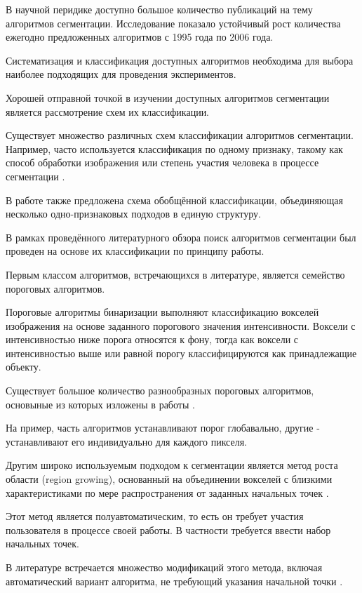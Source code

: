 В научной перидике доступно большое количество публикаций на тему алгоритмов сегментации. Исследование \cite{zhang2006advances} показало устойчивый рост количества ежегодно предложенных алгоритмов с 1995 года по 2006 года.

Систематизация и классификация доступных алгоритмов необходима для выбора наиболее подходящих для проведения экспериментов. 

Хорошей отправной точкой в изучении доступных алгоритмов сегментации является рассмотрение схем их классификации. 

Существует множество различных схем классификации алгоритмов сегментации. Например, часто используется классификация по одному признаку, такому как способ обработки изображения или степень участия человека в процессе сегментации \cite{wirjadi2007survey}.

В работе \cite{ханыков2018классификация} также предложена схема обобщённой классификации, объединяющая несколько одно-признаковых подходов в единую структуру.

В рамках проведённого литературного обзора поиск алгоритмов сегментации был проведен на основе их классификации по принципу работы.

Первым классом алгоритмов, встречающихся в литературе, является семейство пороговых алгоритмов. 

Пороговые алгоритмы бинаризации выполняют классификацию вокселей изображения на основе заданного порогового значения интенсивности. Воксели с интенсивностью ниже порога относятся к фону, тогда как воксели с интенсивностью выше или равной порогу классифицируются как принадлежащие объекту.

Существует большое количество разнообразных пороговых алгоритмов, основыные из которых изложены в работы \cite{wirjadi2007survey}. 

На пример, часть алгоритмов устанавливают порог глобавально, другие - устанавливают его индивидуально для каждого пикселя. 

Другим широко используемым подходом к сегментации является метод роста области (region growing), основанный на объединении вокселей с близкими характеристиками по мере распространения от заданных начальных точек \cite{adams1994seeded}.

Этот метод является полуавтоматическим, то есть он требует участия пользователя в процессе своей работы. В частности требуется ввести набор начальных точек.

В литературе встречается множество модификаций этого метода, включая автоматический вариант алгоритма, не требующий указания начальной точки \cite{lin2000unseeded}. 

